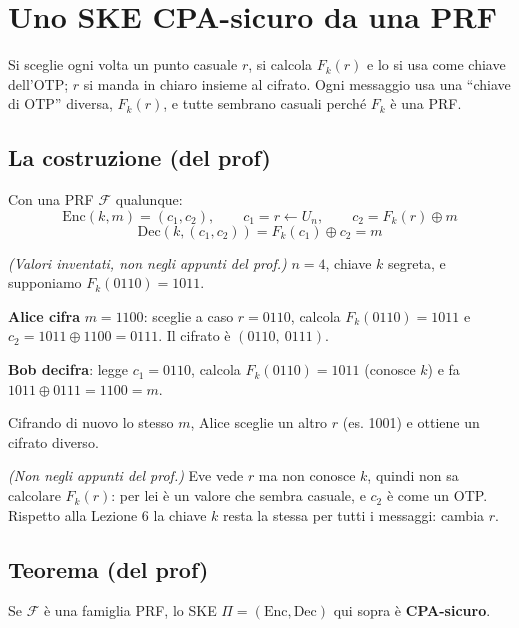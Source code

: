\section{Uno SKE CPA-sicuro da una PRF}

\begin{inbreve}
Si sceglie ogni volta un punto casuale \(r\), si calcola \(F_k(r)\) e lo si usa come chiave dell'OTP; \(r\) si manda in chiaro insieme al cifrato. Ogni messaggio usa una ``chiave di OTP'' diversa, \(F_k(r)\), e tutte sembrano casuali perché \(F_k\) è una PRF.
\end{inbreve}

\subsection{La costruzione (del prof)}

Con una PRF \(\mathcal{F}\) qualunque:
\[
\text{Enc}(k, m) = (c_1, c_2), \qquad c_1 = r \leftarrow U_n, \qquad c_2 = F_k(r) \oplus m
\]
\[
\text{Dec}(k, (c_1, c_2)) = F_k(c_1) \oplus c_2 = m
\]

\begin{esempio}
\emph{(Valori inventati, non negli appunti del prof.)} \(n = 4\), chiave \(k\) segreta, e supponiamo \(F_k(0110) = 1011\).

\textbf{Alice cifra} \(m = 1100\): sceglie a caso \(r = 0110\), calcola \(F_k(0110) = 1011\) e \(c_2 = 1011 \oplus 1100 = 0111\). Il cifrato è \((0110,\ 0111)\).

\textbf{Bob decifra}: legge \(c_1 = 0110\), calcola \(F_k(0110) = 1011\) (conosce \(k\)) e fa \(1011 \oplus 0111 = 1100 = m\).

Cifrando di nuovo lo stesso \(m\), Alice sceglie un altro \(r\) (es. 1001) e ottiene un cifrato diverso.
\end{esempio}

\begin{nota}
\emph{(Non negli appunti del prof.)} Eve vede \(r\) ma non conosce \(k\), quindi non sa calcolare \(F_k(r)\): per lei è un valore che sembra casuale, e \(c_2\) è come un OTP. Rispetto alla Lezione 6 la chiave \(k\) resta la stessa per tutti i messaggi: cambia \(r\).
\end{nota}

\subsection{Teorema (del prof)}

Se \(\mathcal{F}\) è una famiglia PRF, lo SKE \(\Pi = (\text{Enc}, \text{Dec})\) qui sopra è \textbf{CPA-sicuro}.

